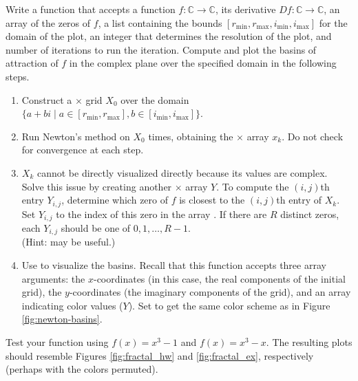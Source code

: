 \begin{problem} %
Write a function that accepts a function $f:\mathbb{C}\rightarrow\mathbb{C}$, its derivative $Df:\mathbb{C}\rightarrow\mathbb{C}$, an array  of the zeros of $f$, a list  containing the bounds $[r_{\text{min}},r_{\text{max}},i_{\text{min}},i_{\text{max}}]$ for the domain of the plot, an integer  that determines the resolution of the plot, and number of iterations  to run the iteration.
Compute and plot the basins of attraction of $f$ in the complex plane over the specified domain in the following steps.
\begin{enumerate}
\item Construct a $\times$ grid $X_0$ over the domain $\{a+bi \mid a \in [r_{\text{min}},r_{\text{max}}], b \in [i_{\text{min}},i_{\text{max}}]\}$.

\item Run Newton's method on $X_0$  times, obtaining the $\times$ array $x_{k}$.
Do not check for convergence at each step.

\item $X_k$ cannot be directly visualized directly because its values are complex.
Solve this issue by creating another $\times$ array $Y$.
To compute the $(i,j)$th entry $Y_{i,j}$, determine which zero of $f$ is closest to the $(i,j)$th entry of $X_k$.
Set $Y_{i,j}$ to the index of this zero in the array .
If there are $R$ distinct zeros, each $Y_{i,j}$ should be one of $0,1,\ldots,R-1$.
\\(Hint:  may be useful.)

\item Use  to visualize the basins.
Recall that this function accepts three array arguments: the $x$-coordinates (in this case, the real components of the initial grid), the $y$-coordinates (the imaginary components of the grid), and an array indicating color values ($Y$).
Set  to get the same color scheme as in Figure \ref{fig:newton-basins}.
\end{enumerate}

Test your function using $f(x) = x^3-1$ and $f(x)=x^3-x$.
The resulting plots should resemble Figures \ref{fig:fractal_hw} and \ref{fig:fractal_ex}, respectively (perhaps with the colors permuted).
\end{problem}


